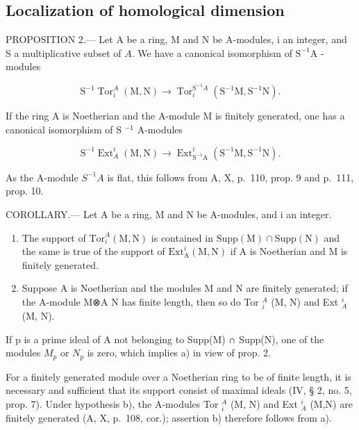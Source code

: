 \subsection{Localization of homological dimension}

PROPOSITION 2.--- Let A be a ring, M and N be A-modules, i an integer, and S a multiplicative subset of \(A\). We have a canonical isomorphism of \(\mathrm{S}^{-1}\mathrm{A}\) -modules

\[
\mathrm{S} ^ {- 1} \operatorname{Tor} _ {i} ^ {A} (\mathrm{M}, \mathrm{N}) \longrightarrow \operatorname{Tor} _ {i} ^ {\mathrm{S} ^ {- 1} A} (\mathrm{S} ^ {- 1} \mathrm{M}, \mathrm{S} ^ {- 1} \mathrm{N}).
\]

If the ring A is Noetherian and the A-module M is finitely generated, one has a canonical isomorphism of S \(^{-1}\) A-modules

\[
\mathrm{S} ^ {- 1} \operatorname{Ext} _ {A} ^ {i} (\mathrm{M}, \mathrm{N}) \longrightarrow \operatorname{Ext} _ {\mathrm{S} ^ {- 1} \mathrm{A}} ^ {i} (\mathrm{S} ^ {- 1} \mathrm{M}, \mathrm{S} ^ {- 1} \mathrm{N}).
\]

As the A-module \(S^{-1}A\) is flat, this follows from A, X, p.~110, prop. 9 and p.~111, prop. 10.

COROLLARY.--- Let A be a ring, M and N be A-modules, and i an integer.

\begin{enumerate}
\def\labelenumi{\alph{enumi})}
\item
  The support of \(\mathrm{Tor}_{i}^{A}(\mathrm{M},\mathrm{N})\) is contained in \(\mathrm{Supp}(\mathrm{M})\cap \mathrm{Supp}(\mathrm{N})\) and the same is true of the support of \(\mathrm{Ext}_{\mathrm{A}}^{i}(\mathrm{M},\mathrm{N})\) if A is Noetherian and M is finitely generated.
\item
  Suppose A is Noetherian and the modules M and N are finitely generated; if the A-module M⊗A N has finite length, then so do Tor \(_{i}^{A}\) (M, N) and Ext \(_{A}^{i}\) (M, N).
\end{enumerate}

If p is a prime ideal of A not belonging to Supp(M) ∩ Supp(N), one of the modules \(M_{p}\) or \(N_{p}\) is zero, which implies a) in view of prop. 2.

For a finitely generated module over a Noetherian ring to be of finite length, it is necessary and sufficient that its support consist of maximal ideals (IV, § 2, no. 5, prop. 7). Under hypothesis b), the A-modules Tor \(_{i}^{A}\) (M, N) and Ext \(_{A}^{i}\) (M,N) are finitely generated (A, X, p.~108, cor.); assertion b) therefore follows from a).

